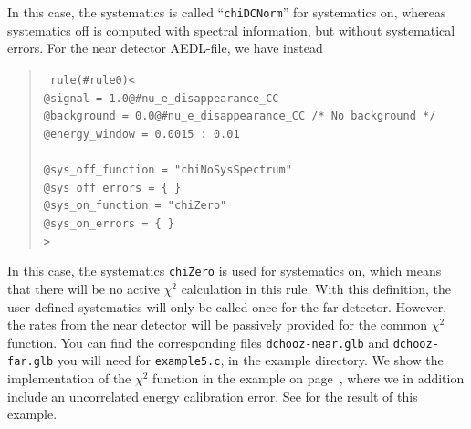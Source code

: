 In this case, the systematics is called ``{\tt chiDCNorm}'' for systematics on, whereas systematics
off is computed with spectral information, but without systematical errors.
For the near detector AEDL-file, we have instead
\begin{quote}
{\tt
rule(\#rule0)< \\
\hspace*{0.5cm}        @signal     = 1.0@\#nu\_e\_disappearance\_CC \\
\hspace*{0.5cm}        @background = 0.0@\#nu\_e\_disappearance\_CC   /* No background */ \\
\hspace*{0.5cm} @energy\_window = 0.0015 : 0.01 \\
\\
\hspace*{0.5cm}        @sys\_off\_function = "chiNoSysSpectrum" \\
\hspace*{0.5cm}        @sys\_off\_errors   = \{ \} \\
\hspace*{0.5cm}        @sys\_on\_function  = "chiZero" \\
\hspace*{0.5cm}        @sys\_on\_errors    = \{ \} \\
> 
}
\end{quote}
In this case, the systematics {\tt chiZero} is used for systematics on, which means that there will
be no active $\chi^2$ calculation in this rule. With this definition, the user-defined systematics
will only be called once for the far detector. However, the rates from the near detector will be 
passively provided for the common $\chi^2$ function.
You can find the corresponding files {\tt dchooz-near.glb} and {\tt dchooz-far.glb} you will need for {\tt example5.c}, in the example directory. 
%
We show the implementation of the $\chi^2$ function in the example on page~\pageref{ex:syst},
where we in addition include an uncorrelated energy calibration error. See  for the result
of this example.
%
